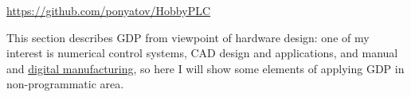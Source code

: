\secdown

\url{https://github.com/ponyatov/HobbyPLC}
\bigskip

This section describes GDP from viewpoint of hardware design: one of my interest
is numerical control systems, CAD design and applications, and manual and
\href{https://en.wikipedia.org/wiki/Digital_manufacturing}{digital
manufacturing}, so here I will show some elements of applying GDP in
non-programmatic area.
\secup